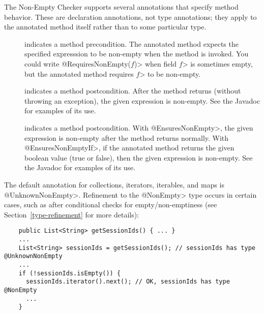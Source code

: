 
The Non-Empty Checker supports several annotations that specify method
behavior.  These are declaration annotations, not type annotations;  they
apply to the annotated method itself rather than to some particular type.

\begin{description}

\item[]
  indicates a method precondition.  The annotated method expects the
  specified expresssion to be non-empty when the
  method is invoked.  You could write \<@RequiresNonEmpty($f$)> when field
  \<$f$> is sometimes empty, but the annotated method requires
  \<$f$> to be non-empty.

\item[]
  indicates a method postcondition.  After the method returns (without
  throwing an exception), the given
  expression is non-empty. See the Javadoc for examples of its use.

\item[]
  indicates a method postcondition.  With \<@EnsuresNonEmpty>, the given
  expression is non-empty after the method returns normally.  With
  \<@EnsuresNonEmptyIf>, if the annotated
  method returns the given boolean value (true or false), then the given
  expression is non-empty. See the Javadoc for examples of its use.

\end{description}



The default annotation for collections, iterators, iterables, and maps is
\<@UnknownNonEmpty>.
Refinement to the \<@NonEmpty> type occurs in certain cases, such as after
conditional checks for empty/non-emptiness (see Section~\ref{type-refinement} for
more details):

\begin{Verbatim}
    public List<String> getSessionIds() { ... }
    ...
    List<String> sessionIds = getSessionIds(); // sessionIds has type @UnknownNonEmpty
    ...
    if (!sessionIds.isEmpty()) {
      sessionIds.iterator().next(); // OK, sessionIds has type @NonEmpty
      ...
    }
\end{Verbatim}

